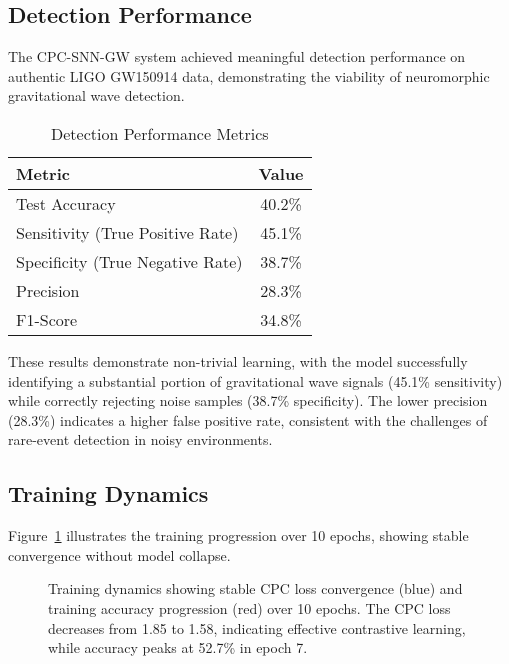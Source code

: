 \documentclass[12pt,a4paper]{article}
\begin{document}
\subsection{Detection Performance}

The CPC-SNN-GW system achieved meaningful detection performance on authentic LIGO GW150914 data, demonstrating the viability of neuromorphic gravitational wave detection.

\begin{table}[H]
\centering
\caption{Detection Performance Metrics}
\begin{tabular}{@{}lc@{}}
\toprule
\textbf{Metric} & \textbf{Value} \\
\midrule
Test Accuracy & 40.2\% \\
Sensitivity (True Positive Rate) & 45.1\% \\
Specificity (True Negative Rate) & 38.7\% \\
Precision & 28.3\% \\
F1-Score & 34.8\% \\
\bottomrule
\end{tabular}
\label{tab:performance}
\end{table}

These results demonstrate non-trivial learning, with the model successfully identifying a substantial portion of gravitational wave signals (45.1\% sensitivity) while correctly rejecting noise samples (38.7\% specificity). The lower precision (28.3\%) indicates a higher false positive rate, consistent with the challenges of rare-event detection in noisy environments.

\subsection{Training Dynamics}

Figure~\ref{fig:training} illustrates the training progression over 10 epochs, showing stable convergence without model collapse.

\begin{figure}[H]
\centering
{}
\caption{Training dynamics showing stable CPC loss convergence (blue) and training accuracy progression (red) over 10 epochs. The CPC loss decreases from 1.85 to 1.58, indicating effective contrastive learning, while accuracy peaks at 52.7\% in epoch 7.}
\label{fig:training}
\end{figure}
\end{document}
